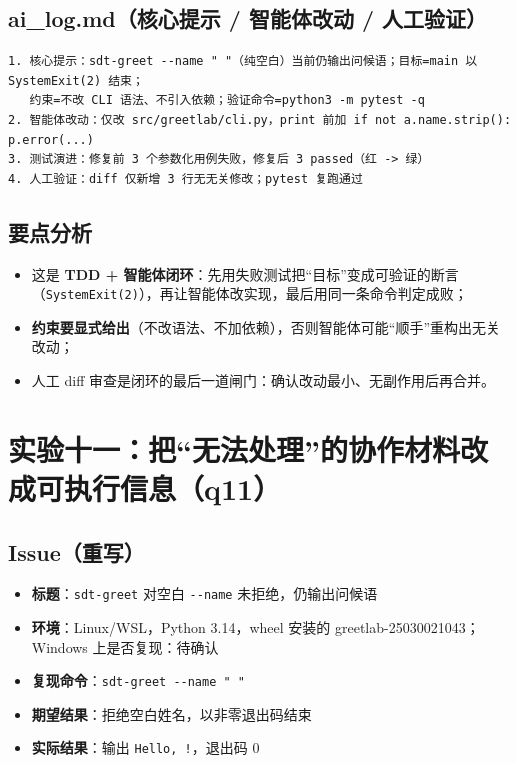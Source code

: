 \documentclass[UTF8,fontset=ubuntu]{ctexart}
\begin{document}
\subsection{ai\_log.md（核心提示 / 智能体改动 / 人工验证）}
\begin{lstlisting}
1. 核心提示：sdt-greet --name " "（纯空白）当前仍输出问候语；目标=main 以 SystemExit(2) 结束；
   约束=不改 CLI 语法、不引入依赖；验证命令=python3 -m pytest -q
2. 智能体改动：仅改 src/greetlab/cli.py，print 前加 if not a.name.strip(): p.error(...)
3. 测试演进：修复前 3 个参数化用例失败，修复后 3 passed（红 -> 绿）
4. 人工验证：diff 仅新增 3 行无无关修改；pytest 复跑通过
\end{lstlisting}

\subsection{要点分析}
\begin{itemize}
\item 这是 \textbf{TDD + 智能体闭环}：先用失败测试把“目标”变成可验证的断言（\lstinline|SystemExit(2)|），再让智能体改实现，最后用同一条命令判定成败；
\item \textbf{约束要显式给出}（不改语法、不加依赖），否则智能体可能“顺手”重构出无关改动；
\item 人工 diff 审查是闭环的最后一道闸门：确认改动最小、无副作用后再合并。
\end{itemize}

\section{实验十一：把“无法处理”的协作材料改成可执行信息（q11）}

\subsection{Issue（重写）}
\begin{itemize}
\item \textbf{标题}：\lstinline|sdt-greet| 对空白 \lstinline|--name| 未拒绝，仍输出问候语
\item \textbf{环境}：Linux/WSL，Python 3.14，wheel 安装的 greetlab-25030021043；Windows 上是否复现：待确认
\item \textbf{复现命令}：\lstinline|sdt-greet --name " "|
\item \textbf{期望结果}：拒绝空白姓名，以非零退出码结束
\item \textbf{实际结果}：输出 \lstinline|Hello, !|，退出码 0
\end{itemize}
\end{document}
